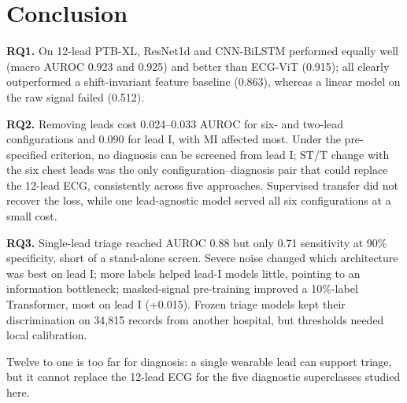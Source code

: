 \section{Conclusion}
\label{sec:conclusion}

\textbf{RQ1.} On 12-lead PTB-XL, ResNet1d and CNN-BiLSTM performed equally well (macro AUROC 0.923 and 0.925) and better than ECG-ViT (0.915); all clearly outperformed a shift-invariant feature baseline (0.863), whereas a linear model on the raw signal failed (0.512).

\textbf{RQ2.} Removing leads cost 0.024--0.033 AUROC for six- and two-lead configurations and 0.090 for lead I, with MI affected most. Under the pre-specified criterion, no diagnosis can be screened from lead I; ST/T change with the six chest leads was the only configuration--diagnosis pair that could replace the 12-lead ECG, consistently across five approaches. Supervised transfer did not recover the loss, while one lead-agnostic model served all six configurations at a small cost.

\textbf{RQ3.} Single-lead triage reached AUROC 0.88 but only 0.71 sensitivity at 90\% specificity, short of a stand-alone screen. Severe noise changed which architecture was best on lead I; more labels helped lead-I models little, pointing to an information bottleneck; masked-signal pre-training improved a 10\%-label Transformer, most on lead I (+0.015). Frozen triage models kept their discrimination on 34,815 records from another hospital, but thresholds needed local calibration.

Twelve to one is too far for diagnosis: a single wearable lead can support triage, but it cannot replace the 12-lead ECG for the five diagnostic superclasses studied here.

